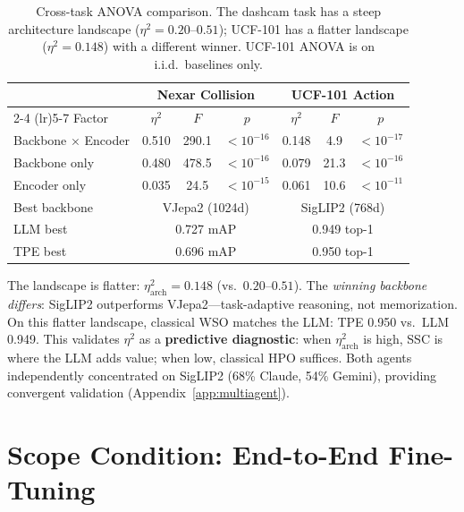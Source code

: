 \documentclass{article}
\begin{document}
\begin{table}[t]
\centering
\caption{Cross-task ANOVA comparison. The dashcam task has a steep architecture landscape ($\eta^2 = 0.20$--$0.51$); UCF-101 has a flatter landscape ($\eta^2 = 0.148$) with a different winner. UCF-101 ANOVA is on i.i.d.\ baselines only.}
\label{tab:ucf101_anova}
\small
\begin{tabular}{@{}lcccccc@{}}
\toprule
 & \multicolumn{3}{c}{Nexar Collision} & \multicolumn{3}{c}{UCF-101 Action} \\
\cmidrule(lr){2-4} \cmidrule(lr){5-7}
Factor & $\eta^2$ & $F$ & $p$ & $\eta^2$ & $F$ & $p$ \\
\midrule
Backbone $\times$ Encoder & 0.510 & 290.1 & $<10^{-16}$ & 0.148 & 4.9 & $<10^{-17}$ \\
Backbone only & 0.480 & 478.5 & $<10^{-16}$ & 0.079 & 21.3 & $<10^{-16}$ \\
Encoder only & 0.035 & 24.5 & $<10^{-15}$ & 0.061 & 10.6 & $<10^{-11}$ \\
\midrule
Best backbone & \multicolumn{3}{c}{VJepa2 (1024d)} & \multicolumn{3}{c}{SigLIP2 (768d)} \\
LLM best & \multicolumn{3}{c}{0.727 mAP} & \multicolumn{3}{c}{0.949 top-1} \\
TPE best & \multicolumn{3}{c}{0.696 mAP} & \multicolumn{3}{c}{0.950 top-1} \\
\bottomrule
\end{tabular}
\end{table}

The landscape is flatter: $\eta^2_{\text{arch}} = 0.148$ (vs.\ $0.20$--$0.51$). The \emph{winning backbone differs}: SigLIP2 outperforms VJepa2---task-adaptive reasoning, not memorization.
On this flatter landscape, classical WSO matches the LLM: TPE 0.950 vs.\ LLM 0.949. This validates $\eta^2$ as a \textbf{predictive diagnostic}: when $\eta^2_{\mathrm{arch}}$ is high, SSC is where the LLM adds value; when low, classical HPO suffices. Both agents independently concentrated on SigLIP2 (68\% Claude, 54\% Gemini), providing convergent validation (Appendix~\ref{app:multiagent}).


\section{Scope Condition: End-to-End Fine-Tuning}
\label{sec:e2e}
\end{document}
